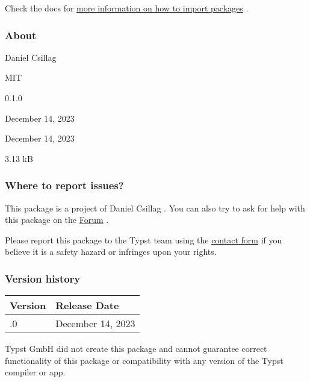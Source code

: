 Check the docs for
\href{https://typst.app/docs/reference/scripting/\#packages}{more
information on how to import packages} .

\subsubsection{About}\label{about}

\begin{description}
\tightlist
\item[Author :]
Daniel Csillag
\item[License:]
MIT
\item[Current version:]
0.1.0
\item[Last updated:]
December 14, 2023
\item[First released:]
December 14, 2023
\item[Archive size:]
3.13 kB
\href{https://packages.typst.org/preview/minienvs-0.1.0.tar.gz}{\pandocbounded{}}
\end{description}

\subsubsection{Where to report issues?}\label{where-to-report-issues}

This package is a project of Daniel Csillag . You can also try to ask
for help with this package on the \href{https://forum.typst.app}{Forum}
.

Please report this package to the Typst team using the
\href{https://typst.app/contact}{contact form} if you believe it is a
safety hazard or infringes upon your rights.

\label{versions}
\subsubsection{Version history}\label{version-history}

\begin{longtable}[]{@{}ll@{}}
\toprule\noalign{}
Version & Release Date \\
\midrule\noalign{}
\endhead
\bottomrule\noalign{}
\endlastfoot
0.1.0 & December 14, 2023 \\
\end{longtable}

Typst GmbH did not create this package and cannot guarantee correct
functionality of this package or compatibility with any version of the
Typst compiler or app.
